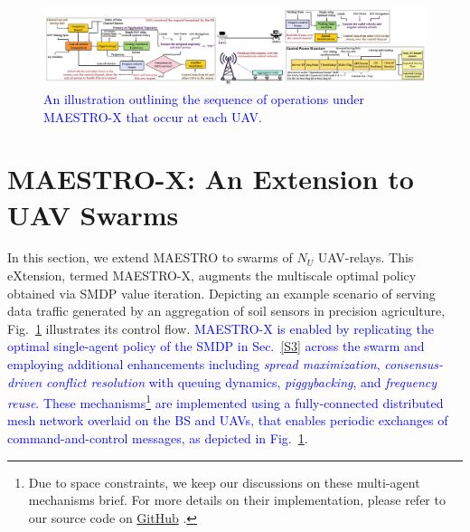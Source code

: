 \documentclass[12pt, draftcls, onecolumn]{IEEEtran}
\theoremstyle{plain}
\theoremstyle{definition}
\theoremstyle{remark}
\newcommand\hlt[1]{\textcolor{blue}{#1}}
\begin{document}
\begin{figure} [t]
    \centering
    \includegraphics[width=1.0\linewidth]{figs/Operational_Model_Updated.jpeg}
    \vspace{-8mm}
    \caption{\hlt{An illustration outlining the sequence of operations under MAESTRO-X that occur at each UAV.}}
    \label{F5}
\end{figure}
\vspace{-4mm}

\section{MAESTRO-X: An Extension to UAV Swarms}\label{S5}
In this section, we extend MAESTRO to swarms of $N_{U}$ UAV-relays. This eXtension, termed MAESTRO-X, augments the multiscale optimal policy obtained via SMDP value iteration. Depicting an example scenario of serving data traffic generated by an aggregation of soil sensors in precision agriculture, Fig.~\ref{F5} illustrates its control flow. 
\hlt{MAESTRO-X is enabled by replicating the optimal single-agent policy of the SMDP in Sec.~\ref{S3} across the swarm and employing additional enhancements including \emph{spread maximization}, \emph{consensus-driven conflict resolution} with queuing dynamics, \emph{piggybacking}, and \emph{frequency reuse}. These mechanisms\footnote{Due to space constraints, we keep our discussions on these multi-agent mechanisms brief. For more details on their implementation, please refer to our source code on \href{https://github.com/bharathkeshavamurthy/MAESTRO-X.git}{GitHub} \cite{MAESTRO-X}.} are implemented using a fully-connected distributed mesh network overlaid on the BS and UAVs,
that enables periodic exchanges of command-and-control messages, as depicted in Fig.~\ref{F5}.}
\end{document}
